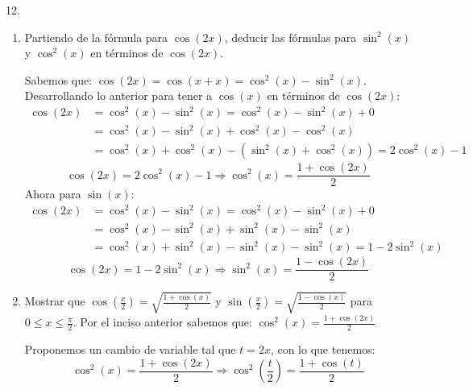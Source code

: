 \documentclass[12pt]{article}
\begin{document}
12.
\begin{enumerate}[\hspace{9px} a)]
    \item Partiendo de la f\'ormula para $\cos(2x)$, deducir las f\'ormulas para $\sin^2(x)$ y $\cos^2(x)$ en t\'erminos de $\cos(2x)$.\bigskip
    
        Sabemos que: \(\cos(2x)=\cos(x+x)=\cos^2(x)-\sin^2(x)\).\bigskip
        Desarrollando lo anterior para tener a $\cos(x)$ en t\'erminos de $\cos(2x)$:
        \begin{align*}
            \cos(2x) &= \cos^2(x)-\sin^2(x) = \cos^2(x)-\sin^2(x) + 0 \\
            &= \cos^2(x)-\sin^2(x) + \cos^2(x) - \cos^2(x) \\
            &= \cos^2(x) + \cos^2(x) -(\sin^2(x)+\cos^2(x)) = 2\cos^2(x)-1
        \end{align*}
        \begin{equation*}
            \cos(2x)= 2\cos^2(x)-1 \Longrightarrow \cos^2(x) = \frac{1+\cos(2x)}{2}
        \end{equation*}
        Ahora para $\sin(x)$:
        \begin{align*}
            \cos(2x) &= \cos^2(x)-\sin^2(x) = \cos^2(x)-\sin^2(x) + 0 \\
            &= \cos^2(x)-\sin^2(x) + \sin^2(x) - \sin^2(x) \\
            &= \cos^2(x)+\sin^2(x) - \sin^2(x) - \sin^2(x) = 1 - 2\sin^2(x)
        \end{align*}
        \begin{equation*}
            \cos(2x) = 1 - 2\sin^2(x) \Longrightarrow \sin^2(x) = \frac{1-\cos(2x)}{2}
        \end{equation*}

    \item Mostrar que \(\cos\left(\displaystyle\frac{x}{2}\right)=\sqrt{\frac{1+\cos(x)}{2}}\) y \(\sin\left(\displaystyle\frac{x}{2}\right)=\sqrt{\frac{1-\cos(x)}{2}}\) para \(0 \leq x \leq \displaystyle\frac{\pi}{2}\).\bigskip
        Por el inciso anterior sabemos que: \(\cos^2(x) = \frac{1+\cos(2x)}{2}\)\bigskip

        Proponemos un cambio de variable tal que \(t=2x\), con lo que tenemos:
        \[\cos^2(x) = \frac{1+\cos(2x)}{2} \Longrightarrow \cos^2\left(\displaystyle\frac{t}{2}\right)=\frac{1+\cos(t)}{2}\]


\end{enumerate}
\end{document}
